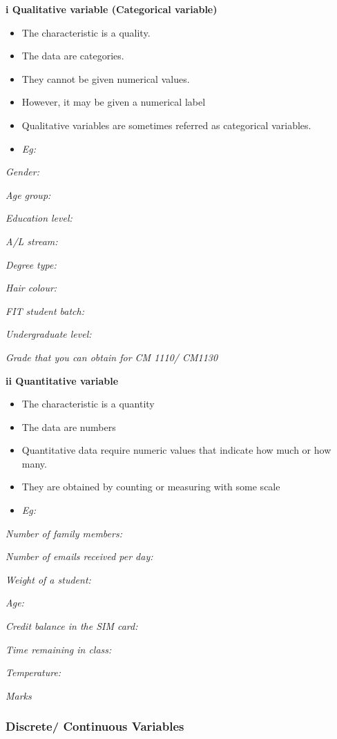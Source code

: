 \documentclass[]{book}
\providecommand{\tightlist}{%
  \setlength{\itemsep}{0pt}\setlength{\parskip}{0pt}}
\begin{document}
\textbf{i Qualitative variable (Categorical variable)}

\begin{itemize}
\tightlist
\item
  The characteristic is a quality.
\item
  The data are categories.
\item
  They cannot be given numerical values.
\item
  However, it may be given a numerical label
\item
  Qualitative variables are sometimes referred as categorical variables.
\item
  \emph{Eg:}
\end{itemize}

\emph{Gender:}

\emph{Age group:}

\emph{Education level:}

\emph{A/L stream:}

\emph{Degree type:}

\emph{Hair colour: }

\emph{FIT student batch:}

\emph{Undergraduate level:}

\emph{Grade that you can obtain for CM 1110/ CM1130}

\textbf{ii Quantitative variable }

\begin{itemize}
\tightlist
\item
  The characteristic is a quantity
\item
  The data are numbers
\item
  Quantitative data require numeric values that indicate how much or how many.
\item
  They are obtained by counting or measuring with some scale
\item
  \emph{Eg: }
\end{itemize}

\emph{Number of family members:}

\emph{Number of emails received per day:}

\emph{Weight of a student:}

\emph{Age:}

\emph{Credit balance in the SIM card:}

\emph{Time remaining in class:}

\emph{Temperature:}

\emph{Marks }

\hypertarget{discrete-continuous-variables}{%
\subsubsection{Discrete/ Continuous Variables}\label{discrete-continuous-variables}}
\end{document}
